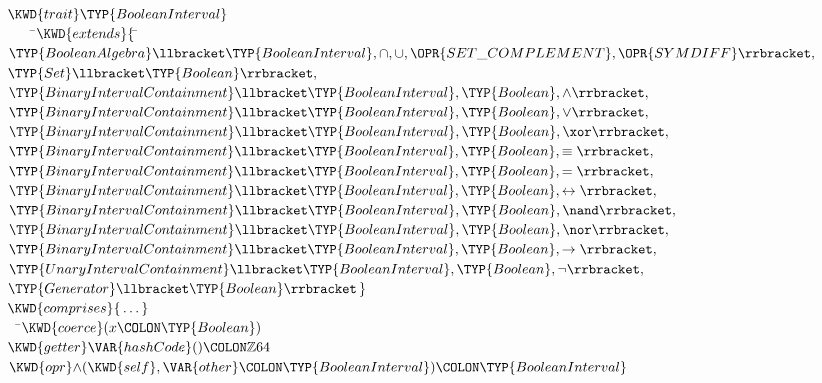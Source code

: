 \begin{Fortress}
\(\KWD{trait} \TYP{BooleanInterval}\)\\
{\tt~~~~}\pushtabs\=\+\(    \KWD{extends} \{\,\null\)\pushtabs\=\+\(\TYP{BooleanAlgebra}\llbracket\TYP{BooleanInterval}, \cap, \cup, \OPR{SET\_COMPLEMENT}, \OPR{SYMDIFF}\rrbracket,\)\\
\(              \TYP{Set}\llbracket\TYP{Boolean}\rrbracket,\)\\
\(              \TYP{BinaryIntervalContainment}\llbracket\TYP{BooleanInterval},\TYP{Boolean},\wedge\rrbracket,\)\\
\(              \TYP{BinaryIntervalContainment}\llbracket\TYP{BooleanInterval},\TYP{Boolean},\vee\rrbracket,\)\\
\(              \TYP{BinaryIntervalContainment}\llbracket\TYP{BooleanInterval},\TYP{Boolean},\xor\rrbracket,\)\\
\(              \TYP{BinaryIntervalContainment}\llbracket\TYP{BooleanInterval},\TYP{Boolean},\equiv\rrbracket,\)\\
\(              \TYP{BinaryIntervalContainment}\llbracket\TYP{BooleanInterval},\TYP{Boolean},=\rrbracket,\)\\
\(              \TYP{BinaryIntervalContainment}\llbracket\TYP{BooleanInterval},\TYP{Boolean},\leftrightarrow\rrbracket,\)\\
\(              \TYP{BinaryIntervalContainment}\llbracket\TYP{BooleanInterval},\TYP{Boolean},\nand\rrbracket,\)\\
\(              \TYP{BinaryIntervalContainment}\llbracket\TYP{BooleanInterval},\TYP{Boolean},\nor\rrbracket,\)\\
\(              \TYP{BinaryIntervalContainment}\llbracket\TYP{BooleanInterval},\TYP{Boolean},\rightarrow\rrbracket,\)\\
\(              \TYP{UnaryIntervalContainment}\llbracket\TYP{BooleanInterval},\TYP{Boolean},\neg\rrbracket,\)\\
\(              \TYP{Generator}\llbracket\TYP{Boolean}\rrbracket\,\}\)\-\\\poptabs
\(    \KWD{comprises} \{\,\ldots\,\}\)\-\\\poptabs
{\tt~~}\pushtabs\=\+\(  \KWD{coerce} (x\COLON \TYP{Boolean})\)\\
\(  \KWD{getter} \VAR{hashCode}()\COLON \mathbb{Z}64\)\\
\(  \KWD{opr} \mathord{\wedge}(\KWD{self}, \VAR{other}\COLON \TYP{BooleanInterval})\COLON \TYP{BooleanInterval}\)\\

\end{Fortress}
